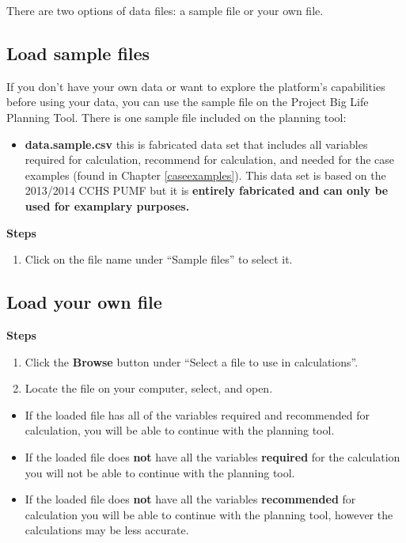 \documentclass[]{book}
\providecommand{\tightlist}{%
  \setlength{\itemsep}{0pt}\setlength{\parskip}{0pt}}
\begin{document}
There are two options of data files: a sample file or your own file.

\subsection{Load sample files}\label{load-sample-files}

If you don't have your own data or want to explore the platform's
capabilities before using your data, you can use the sample file on the
Project Big Life Planning Tool. There is one sample file included on the
planning tool:

\begin{itemize}
\tightlist
\item
  \textbf{data.sample.csv} this is fabricated data set that includes all
  variables required for calculation, recommend for calculation, and
  needed for the case examples (found in Chapter \ref{caseexamples}).
  This data set is based on the 2013/2014 CCHS PUMF but it is
  \textbf{entirely fabricated and can only be used for examplary
  purposes.}
\end{itemize}

\textbf{Steps}

\begin{enumerate}
\def\labelenumi{\arabic{enumi}.}
\tightlist
\item
  Click on the file name under ``Sample files'' to select it.
\end{enumerate}

\subsection{Load your own file}\label{load-your-own-file}

\textbf{Steps}

\begin{enumerate}
\def\labelenumi{\arabic{enumi}.}
\item
  Click the \textbf{Browse} button under ``Select a file to use in
  calculations''.
\item
  Locate the file on your computer, select, and open.
\end{enumerate}

\begin{itemize}
\item
  If the loaded file has all of the variables required and recommended
  for calculation, you will be able to continue with the planning tool.
\item
  If the loaded file does \textbf{not} have all the variables
  \textbf{required} for the calculation you will not be able to continue
  with the planning tool.
\item
  If the loaded file does \textbf{not} have all the variables
  \textbf{recommended} for calculation you will be able to continue with
  the planning tool, however the calculations may be less accurate.
\end{itemize}
\end{document}
